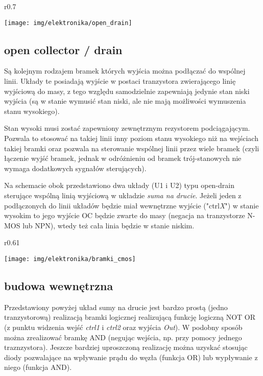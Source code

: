 \documentclass{pdfBooklets}
\begin{document}
\begin{wrapfigure}{r}{0.7\textwidth}
  \begin{center}
    \vspace{-40pt}
    \texttt{[image: img/elektronika/open\_drain]}
    \vspace{-20pt}
  \end{center}
\end{wrapfigure}
\subsection{open collector / drain}
Są kolejnym rodzajem bramek których wyjścia można podłączać do wspólnej linii. Układy te posiadają wyjście w postaci tranzystora zwierającego linię wyjściową do masy, z tego względu samodzielnie zapewniają jedynie stan niski wyjścia (są w stanie wymusić stan niski, ale nie mają możliwości wymuszenia stanu wysokiego).

Stan wysoki musi zostać zapewniony zewnętrznym rezystorem podciągającym. Pozwala to stosować na takiej linii inny poziom stanu wysokiego niż na wejściach takiej bramki oraz pozwala na sterowanie wspólnej linii przez wiele bramek (czyli łączenie wyjść bramek, jednak w odróżnieniu od bramek trój-stanowych nie wymaga dodatkowych sygnałów sterujących).

Na schemacie obok przedstawiono dwa układy (U1 i U2) typu open-drain sterujące wspólną linią wyjściową w układzie \emph{suma na drucie}. Jeżeli jeden z podłączonych do linii układów będzie miał wewnętrzne wyjście ("ctrl\textit{X}") w stanie wysokim to jego wyjście OC będzie zwarte do masy (negacja na tranzystorze N-MOS lub NPN), wtedy też cała linia będzie w stanie niskim.


\begin{wrapfigure}{r}{0.61\textwidth}
  \begin{center}
    \vspace{-45pt}
    \texttt{[image: img/elektronika/bramki\_cmos]}
    \vspace{-35pt}
  \end{center}
\end{wrapfigure}
\subsection{budowa wewnętrzna}
Przedstawiony powyżej układ sumy na drucie jest bardzo prostą (jedno tranzystorową) realizacją bramki logicznej realizującą funkcję logiczną NOT OR (z punktu widzenia wejść \textit{ctrl1} i \textit{ctrl2} oraz wyjścia \textit{Out}).
W podobny sposób można zrealizować bramkę AND (negując wejścia, np. przy pomocy jednego traznzystora).
Jeszcze bardziej uproszczoną realizację można uzyskać stosując diody pozwalające na wpływanie prądu do węzła (funkcja OR) lub wypływanie z niego (funkcja AND).
\end{document}
